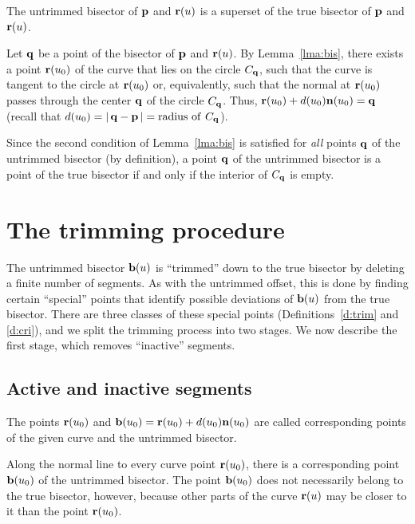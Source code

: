 \begin{propn}
\label{p:superset}
The untrimmed bisector of ${\bf p}$ and ${\bf r}(u)$ is a superset
of the true bisector of ${\bf p}$ and ${\bf r}(u)$.
\end{propn}
\prf
Let ${\bf q}$ be a point of the bisector of ${\bf p}$ and ${\bf r}(u)$.
By Lemma~\ref{lma:bis}, there exists a point ${\bf r}(u_{0})$ of the
curve that lies on the circle $C_{\bf q}$, such that the curve is tangent
to the circle at ${\bf r}(u_{0})$ or, equivalently, such that the normal
at ${\bf r}(u_{0})$ passes through the center ${\bf q}$ of the circle
$C_{\bf q}$. Thus, ${\bf r}(u_{0}) + d(u_{0}){\bf n}(u_{0}) = {\bf q}$
(recall that $d(u_0)=|\,{\bf q}-{\bf p}\,|={\rm radius\ of\ } C_{\bf q}$).
\QED

Since the second condition of Lemma~\ref{lma:bis} is satisfied for
{\it all\/} points ${\bf q}$ of the untrimmed bisector (by definition),
a point ${\bf q}$ of the untrimmed bisector is a point of the true
bisector if and only if the interior of $C_{\bf q}$ is empty.

\section{The trimming procedure}
\label{trimming}

The untrimmed bisector ${\bf b}(u)$ is ``trimmed'' down to the true
bisector by deleting a finite number of segments. As with the untrimmed
offset, this is done by finding certain ``special'' points that identify
possible deviations of ${\bf b}(u)$ from the true bisector. There are
three classes of these special points (Definitions~\ref{d:trim} and
\ref{d:cri}), and we split the trimming process into two stages. We
now describe the first stage, which removes ``inactive'' segments.

\subsection{Active and inactive segments}

\begin{dfn}
The points ${\bf r}(u_0)$ and ${\bf b}(u_0)={\bf r}(u_0)+d(u_0){\bf n}
(u_0)$ are called {\rm corresponding points} of the given curve and the
untrimmed bisector.
\end{dfn}

Along the normal line to every curve point ${\bf r}(u_0)$, there is
a corresponding point ${\bf b}(u_0)$ of the untrimmed bisector. The
point ${\bf b}(u_0)$ does not necessarily belong to the true bisector,
however, because other parts of the curve ${\bf r}(u)$ may be closer
to it than the point ${\bf r}(u_0)$.

